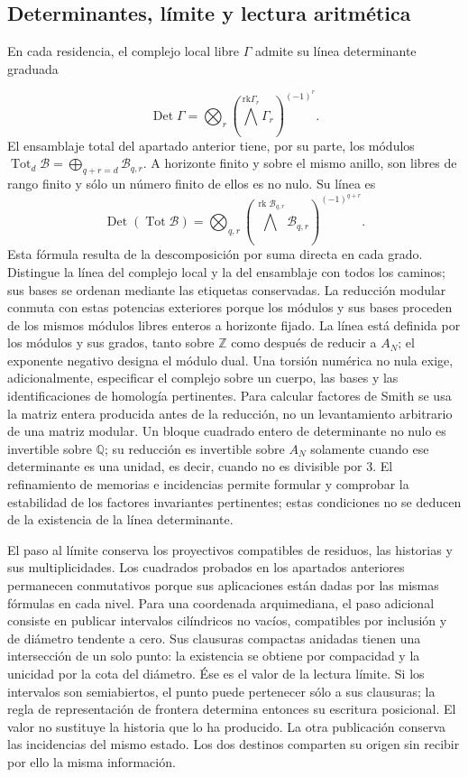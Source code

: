 \subsection{Determinantes, límite y lectura aritmética}
\label{iv:cont:determinantes}
En cada residencia, el complejo local libre \(\Gamma\) admite su línea determinante graduada

\[
\operatorname{Det}\Gamma=
\bigotimes_r\left(\bigwedge^{\mathrm{rk}\Gamma_r}\Gamma_r\right)^{(-1)^r}.
\]
El ensamblaje total del apartado anterior tiene, por su parte, los módulos \(\operatorname{Tot}_d\mathcal B=\bigoplus_{q+r=d}\mathcal B_{q,r}\). A horizonte finito y sobre el mismo anillo, son libres de rango finito y sólo un número finito de ellos es no nulo. Su línea es
\[
\operatorname{Det}(\operatorname{Tot}\mathcal B)=
\bigotimes_{q,r}
\left(\bigwedge^{\operatorname{rk}\mathcal B_{q,r}}
\mathcal B_{q,r}\right)^{(-1)^{q+r}}.
\]
Esta fórmula resulta de la descomposición por suma directa en cada grado. Distingue la línea del complejo local y la del ensamblaje con todos los caminos; sus bases se ordenan mediante las etiquetas conservadas. La reducción modular conmuta con estas potencias exteriores porque los módulos y sus bases proceden de los mismos módulos libres enteros a horizonte fijado.
La línea está definida por los módulos y sus grados, tanto sobre \(\mathbb Z\) como después de reducir a \(A_N\); el exponente negativo designa el módulo dual. Una torsión numérica no nula exige, adicionalmente, especificar el complejo sobre un cuerpo, las bases y las identificaciones de homología pertinentes. Para calcular factores de Smith se usa la matriz entera producida antes de la reducción, no un levantamiento arbitrario de una matriz modular. Un bloque cuadrado entero de determinante no nulo es invertible sobre \(\mathbb Q\); su reducción es invertible sobre \(A_N\) solamente cuando ese determinante es una unidad, es decir, cuando no es divisible por \(3\). El refinamiento de memorias e incidencias permite formular y comprobar la estabilidad de los factores invariantes pertinentes; estas condiciones no se deducen de la existencia de la línea determinante.

El paso al límite conserva los proyectivos compatibles de residuos, las historias y sus multiplicidades. Los cuadrados probados en los apartados anteriores permanecen conmutativos porque sus aplicaciones están dadas por las mismas fórmulas en cada nivel. Para una coordenada arquimediana, el paso adicional consiste en publicar intervalos cilíndricos no vacíos, compatibles por inclusión y de diámetro tendente a cero. Sus clausuras compactas anidadas tienen una intersección de un solo punto: la existencia se obtiene por compacidad y la unicidad por la cota del diámetro. Ése es el valor de la lectura límite. Si los intervalos son semiabiertos, el punto puede pertenecer sólo a sus clausuras; la regla de representación de frontera determina entonces su escritura posicional. El valor no sustituye la historia que lo ha producido. La otra publicación conserva las incidencias del mismo estado. Los dos destinos comparten su origen sin recibir por ello la misma información.

